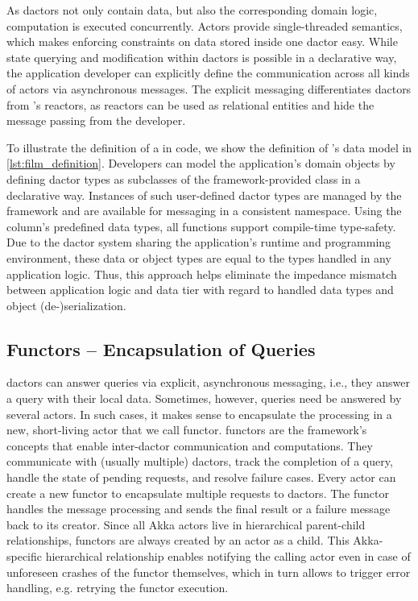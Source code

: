     As \glspl{dactor} not only contain data, but also the corresponding domain logic, computation is executed concurrently.
    Actors provide single-threaded semantics, which makes enforcing constraints on data stored inside one \gls{dactor} easy.
    While state querying and modification within \glspl{dactor} is possible in a declarative way, the application developer can explicitly define the communication across all kinds of actors via asynchronous messages.
    The explicit messaging differentiates \glspl{dactor} from \citet{Shah:reactdb}'s reactors, as reactors can be used as relational entities and hide the message passing from the developer.
    
    To illustrate the definition of a  in code, we show the definition of 's data model in \cref{lst:film_definition}.
    Developers can model the application's domain objects by defining \gls{dactor} types as subclasses of the framework-provided  class in a declarative way.
    Instances of such user-defined \gls{dactor} types are managed by the framework and are available for messaging in a consistent namespace.
    Using the column's predefined data types, all functions support compile-time type-safety.
    Due to the \gls{dactor} system sharing the application's runtime and programming environment, these data or object types are equal to the types handled in any application logic.
    Thus, this approach helps eliminate the impedance mismatch between application logic and data tier with regard to handled data types and object (de-)serialization.

  \subsection{Functors -- Encapsulation of Queries}
    \Glspl{dactor} can answer queries via explicit, asynchronous messaging, {i.e.}, they answer a query with their local data.
    Sometimes, however, queries need be answered by several actors.
    In such cases, it makes sense to encapsulate the processing in a new, short-living actor that we call \gls{functor}.
    \Glspl{functor} are the framework's concepts that enable inter-\gls{dactor} communication and computations.
    They communicate with (usually multiple) \glspl{dactor}, track the completion of a query, handle the state of pending requests, and resolve failure cases.
    Every actor can create a new \gls{functor} to encapsulate multiple requests to \glspl{dactor}.
    The \gls{functor} handles the message processing and sends the final result or a failure message back to its creator.
    Since all Akka actors live in hierarchical parent-child relationships, \glspl{functor} are always created by an actor as a child.
    This Akka-specific hierarchical relationship enables notifying the calling actor even in case of unforeseen crashes of the \gls{functor} themselves, which in turn allows to trigger error handling, e.g. retrying the \gls{functor} execution.

